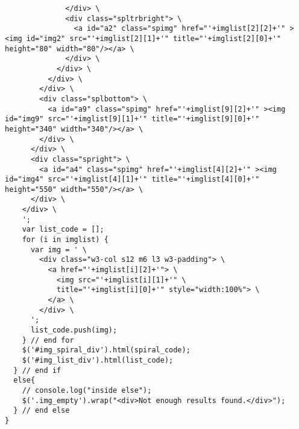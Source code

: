 \begin{listing}[!htbp]
\begin{verbatim}
              </div> \
              <div class="spltrbright"> \
                <a id="a2" class="spimg" href="'+imglist[2][2]+'" ><img id="img2" src="'+imglist[2][1]+'" title="'+imglist[2][0]+'" height="80" width="80"/></a> \
              </div> \
            </div> \
          </div> \
        </div> \
        <div class="splbottom"> \
          <a id="a9" class="spimg" href="'+imglist[9][2]+'" ><img id="img9" src="'+imglist[9][1]+'" title="'+imglist[9][0]+'" height="340" width="340"/></a> \
        </div> \
      </div> \
      <div class="spright"> \
        <a id="a4" class="spimg" href="'+imglist[4][2]+'" ><img id="img4" src="'+imglist[4][1]+'" title="'+imglist[4][0]+'" height="550" width="550"/></a> \
      </div> \
    </div> \
    ';
    var list_code = [];
    for (i in imglist) {
      var img = ' \
        <div class="w3-col s12 m6 l3 w3-padding"> \
          <a href="'+imglist[i][2]+'"> \
            <img src="'+imglist[i][1]+'" \
            title="'+imglist[i][0]+'" style="width:100%"> \
          </a> \
        </div> \
      ';
      list_code.push(img);
    } // end for
    $('#img_spiral_div').html(spiral_code);
    $('#img_list_div').html(list_code);
  } // end if
  else{
    // console.log("inside else");
    $('.img_empty').wrap("<div>Not enough results found.</div>");
  } // end else
}
  \end{verbatim}
\caption[]{}
\label{code:imgspiral}
\end{listing}